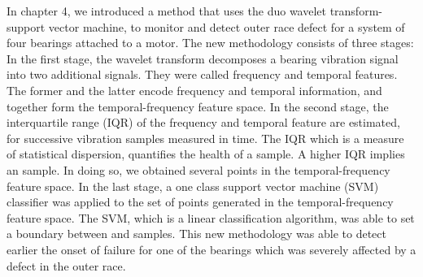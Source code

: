 \documentclass[thesis.tex]{subfiles}
\begin{document}
	\justify
	In chapter 4, we introduced a method that uses the duo wavelet transform-support vector machine, to monitor and detect outer race defect for a system of four bearings attached to a motor. The new methodology consists of three stages: In the first stage, the wavelet transform decomposes a bearing vibration signal into two additional signals. They were called frequency and temporal features. The former and the latter encode frequency and temporal information, and together form the temporal-frequency feature space. In the second stage, the interquartile range (IQR) of the frequency and temporal feature are estimated, for successive vibration samples measured in time. The IQR which is a measure of statistical dispersion, quantifies the health of a sample. A higher IQR implies an  sample. In doing so, we obtained several points in the temporal-frequency feature space.
	\justify
	In the last stage, a one class support vector machine (SVM) classifier was applied to the set of points generated in the temporal-frequency feature space. The SVM, which is a linear classification algorithm, was able to set a boundary between  and  samples.
	This new methodology was able to detect earlier the onset of failure for one of the bearings which was severely affected by a defect in the outer race.
	
	
	
\end{document}
